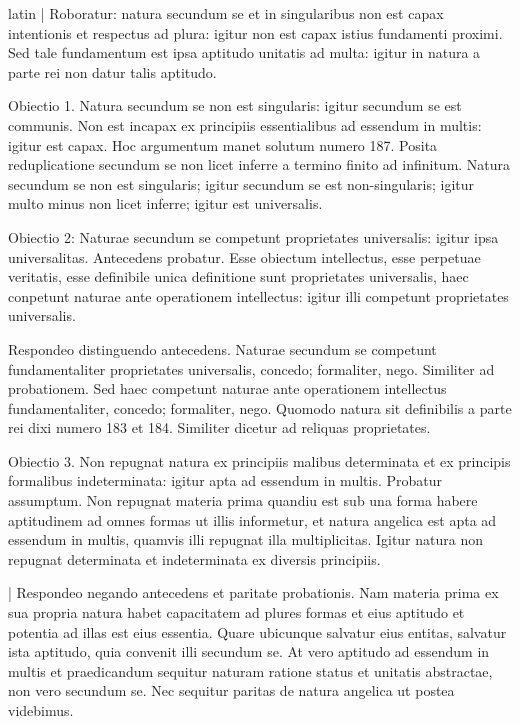 \begin{otherlanguage*}{latin}
\pstart
\textnormal{|} Roboratur:
natura secundum se et in singularibus non est capax intentionis et respectus ad plura:
igitur non est capax istius fundamenti proximi. Sed tale fundamentum est ipsa aptitudo unitatis ad multa:
igitur in natura a parte rei non datur talis aptitudo. 
\pend

\pstart
Obiectio 1. Natura secundum se non est singularis:
igitur secundum se est communis. Non est incapax ex principiis essentialibus ad essendum in multis:
igitur est capax. Hoc argumentum manet solutum numero 187. Posita reduplicatione secundum se non licet inferre a termino finito ad infinitum. Natura secundum se non est singularis; igitur secundum se est non-singularis; igitur multo minus non licet inferre; igitur est universalis. 
\pend

\pstart
Obiectio 2:
Naturae secundum se competunt proprietates universalis:
igitur ipsa universalitas. Antecedens probatur. Esse obiectum intellectus, esse perpetuae veritatis, esse definibile unica definitione sunt proprietates universalis, haec conpetunt naturae ante operationem intellectus:
igitur illi competunt proprietates universalis. 
\pend

\pstart
Respondeo distinguendo antecedens. Naturae secundum se competunt fundamentaliter proprietates universalis, concedo; formaliter, nego. Similiter ad probationem. Sed haec competunt naturae ante operationem intellectus fundamentaliter, concedo; formaliter, nego. Quomodo natura sit definibilis a parte rei dixi numero 183 et 184. Similiter dicetur ad reliquas proprietates. 
\pend

\pstart
Obiectio 3. Non repugnat natura ex principiis malibus determinata et ex principis formalibus indeterminata:
igitur apta ad essendum in multis. Probatur assumptum. Non repugnat materia prima quandiu est sub una forma habere aptitudinem ad omnes formas ut illis informetur, et natura angelica est apta ad essendum in multis, quamvis illi repugnat illa multiplicitas. Igitur natura non repugnat determinata et indeterminata ex diversis principiis. 
\pend

\pstart
\textnormal{|} Respondeo negando antecedens et paritate probationis. Nam materia prima ex sua propria natura habet capacitatem ad plures formas et eius aptitudo et potentia ad illas est eius essentia. Quare ubicunque salvatur eius entitas, salvatur ista aptitudo, quia convenit illi secundum se. At vero aptitudo ad essendum in multis et praedicandum sequitur naturam ratione status et unitatis abstractae, non vero secundum se. Nec sequitur paritas de natura angelica ut postea videbimus. 
\pend


\end{otherlanguage*}
